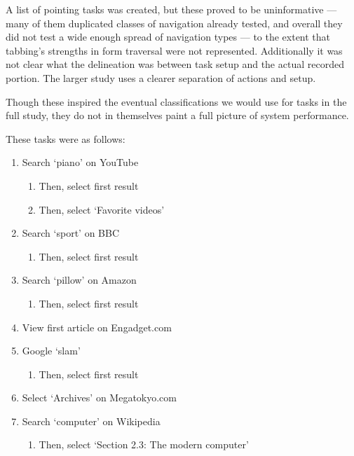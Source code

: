 \documentclass[11pt,openright,a4paper]{report}
\begin{document}
A list of pointing tasks was created, but these proved to be uninformative --- many of them duplicated classes of navigation already tested, and overall they did not test a wide enough spread of navigation types --- to the extent that tabbing's strengths in form traversal were not represented. Additionally it was not clear what the delineation was between task setup and the actual recorded portion. The larger study uses a clearer separation of actions and setup.

Though these inspired the eventual classifications we would use for tasks in the full study, they do not in themselves paint a full picture of system performance.

These tasks were as follows:

\begin{enumerate}
\item Search `piano' on YouTube
	\begin{enumerate}
        \item Then, select first result
        \item Then, select `Favorite videos'
    \end{enumerate}
	
\item Search `sport' on BBC
	\begin{enumerate}
		\item Then, select first result
	\end{enumerate}
	
\item Search `pillow' on Amazon
	\begin{enumerate}
		\item Then, select first result
	\end{enumerate}

\item View first article on Engadget.com

\item Google `slam'
	\begin{enumerate}
		\item Then, select first result
	\end{enumerate}

\item Select `Archives' on Megatokyo.com

\item Search `computer' on Wikipedia
	\begin{enumerate}
		\item Then, select `Section 2.3: The modern computer'
	\end{enumerate}
\end{enumerate}
\end{document}
